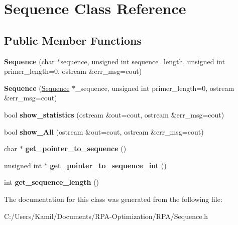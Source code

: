 \hypertarget{class_sequence}{}\section{Sequence Class Reference}
\label{class_sequence}
\subsection*{Public Member Functions}
\begin{DoxyCompactItemize}
\item 
\mbox{\label{class_sequence_acdd11b606b266e81cc5b957e86b45517}} 
{\bfseries Sequence} (char $\ast$sequence, unsigned int sequence\+\_\+length, unsigned int primer\+\_\+length=0, ostream \&err\+\_\+msg=cout)
\item 
\mbox{\label{class_sequence_ad6f16ee0cacbb22596c7a34d8a2f4c14}} 
{\bfseries Sequence} (\mbox{\hyperlink{class_sequence}{Sequence}} $\ast$\+\_\+sequence, unsigned int primer\+\_\+length=0, ostream \&err\+\_\+msg=cout)
\item 
\mbox{\label{class_sequence_adfd0c2b8558f68f764a7690ed9ad4adc}} 
bool {\bfseries show\+\_\+statistics} (ostream \&out=cout, ostream \&err\+\_\+msg=cout)
\item 
\mbox{\label{class_sequence_a01816c20cdd1c716a30b03c24a5a2b7f}} 
bool {\bfseries show\+\_\+\+All} (ostream \&out=cout, ostream \&err\+\_\+msg=cout)
\item 
\mbox{\label{class_sequence_a9c1e7770390e4f1d02ae250d640a32a7}} 
char $\ast$ {\bfseries get\+\_\+pointer\+\_\+to\+\_\+sequence} ()
\item 
\mbox{\label{class_sequence_af37c4ac41b89a5081ca71ff2a9d9bd1c}} 
unsigned int $\ast$ {\bfseries get\+\_\+pointer\+\_\+to\+\_\+sequence\+\_\+int} ()
\item 
\mbox{\label{class_sequence_a5454c394570fa19c2b0ac771c6e74097}} 
int {\bfseries get\+\_\+sequence\+\_\+length} ()
\end{DoxyCompactItemize}


The documentation for this class was generated from the following file\+:\begin{DoxyCompactItemize}
\item 
C\+:/\+Users/\+Kamil/\+Documents/\+R\+P\+A-\/\+Optimization/\+R\+P\+A/Sequence.\+h\end{DoxyCompactItemize}
